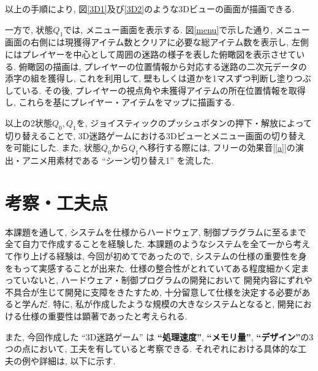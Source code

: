 \documentclass[10pt]{jsarticle}
\begin{document}
以上の手順により, 図\ref{3D1}及び\ref{3D2}のような3Dビューの画面が描画できる.

一方で, 状態$Q_1$では, メニュー画面を表示する.
図\ref{menu}で示した通り, メニュー画面の右側には現獲得アイテム数とクリアに必要な総アイテム数を表示し,
左側にはプレイヤーを中心として周囲の迷路の様子を表した俯瞰図を表示させている.
俯瞰図の描画は, プレイヤーの位置情報から対応する迷路の二次元データの添字の組を獲得し, 
これを利用して, 壁もしくは道かを1マスずつ判断し塗りつぶしている.
その後, プレイヤーの視点角や未獲得アイテムの所在位置情報を取得し, これらを基にプレイヤー・アイテムをマップに描画する.

以上の2状態$Q_0,Q_1$を, ジョイスティックのプッシュボタンの押下・解放によって切り替えることで, 
3D迷路ゲームにおける3Dビューとメニュー画面の切り替えを可能にした.
また, 状態$Q_0$から$Q_1$へ移行する際には, フリーの効果音[\ref{a}]の演出・アニメ用素材である ``シーン切り替え1'' を流した.

\section{考察・工夫点}

本課題を通して, システムを仕様からハードウェア, 制御プラグラムに至るまで全て自力で作成することを経験した.
本課題のようなシステムを全て一から考えて作り上げる経験は, 今回が初めてであったので,
システムの仕様の重要性を身をもって実感することが出来た.
仕様の整合性がとれていてある程度細かく定まっていないと, ハードウェア・制御プログラムの開発において
開発内容にずれや不具合が生じて開発に支障をきたすため, 十分留意して仕様を決定する必要があると学んだ.
特に, 私が作成したような規模の大きなシステムとなると, 開発における仕様の重要性は顕著であったと考えられる.

また, 今回作成した ``3D迷路ゲーム'' は \textbf{``処理速度''}, \textbf{``メモリ量''}, \textbf{``デザイン''}の3つの点において,
工夫を有していると考察できる.
それぞれにおける具体的な工夫の例や詳細は, 以下に示す.
\end{document}
